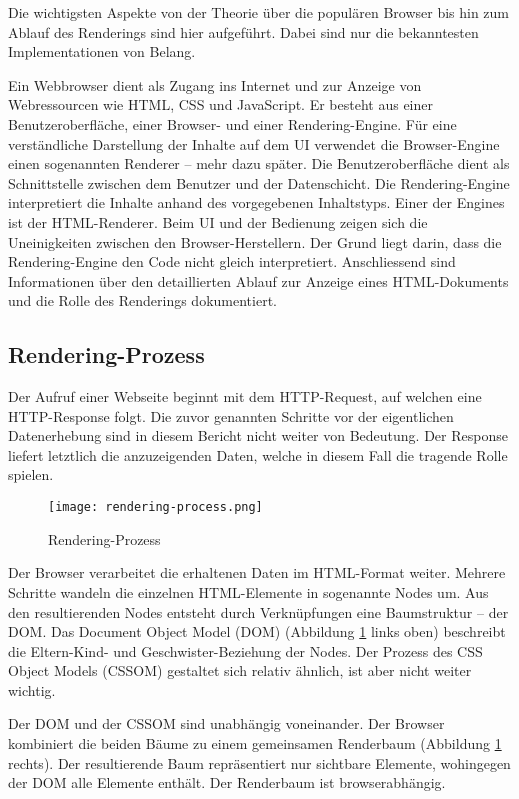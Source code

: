 Die wichtigsten Aspekte von der Theorie über die populären Browser bis hin zum Ablauf des Renderings sind hier aufgeführt. 
Dabei sind nur die bekanntesten Implementationen von Belang. 

Ein Webbrowser dient als Zugang ins Internet und zur Anzeige von Webressourcen wie HTML, CSS und JavaScript. 
Er besteht aus einer Benutzeroberfläche, einer Browser- und einer Rendering-Engine. 
Für eine verständliche Darstellung der Inhalte auf dem UI verwendet die Browser-Engine einen sogenannten Renderer – mehr dazu später. 
Die Benutzeroberfläche dient als Schnittstelle zwischen dem Benutzer und der Datenschicht. 
Die Rendering-Engine interpretiert die Inhalte anhand des vorgegebenen Inhaltstyps. 
Einer der Engines ist der HTML-Renderer. 
Beim UI und der Bedienung zeigen sich die Uneinigkeiten zwischen den Browser-Herstellern. 
Der Grund liegt darin, dass die Rendering-Engine den Code nicht gleich interpretiert. 
Anschliessend sind Informationen über den detaillierten Ablauf zur Anzeige eines HTML-Dokuments und die Rolle des Renderings dokumentiert. 


\subsection{Rendering-Prozess}
\label{sec:structureRendering}

Der Aufruf einer Webseite beginnt mit dem HTTP-Request, auf welchen eine HTTP-Response folgt.
Die zuvor genannten Schritte vor der eigentlichen Datenerhebung sind in diesem Bericht nicht weiter von Bedeutung.
Der Response liefert letztlich die anzuzeigenden Daten, welche in diesem Fall die tragende Rolle spielen.

\begin{figure}[!htb]
    \centering
    \texttt{[image: rendering-process.png]}
    \caption{\centering Rendering-Prozess}
    \label{img:renderingProcess}
\end{figure}

Der Browser verarbeitet die erhaltenen Daten im HTML-Format weiter. 
Mehrere Schritte wandeln die einzelnen HTML-Elemente in sogenannte Nodes um. 
Aus den resultierenden Nodes entsteht durch Verknüpfungen eine Baumstruktur – der DOM. 
Das Document Object Model (DOM) (Abbildung \ref{img:renderingProcess} links oben) beschreibt die Eltern-Kind- und Geschwister-Beziehung der Nodes. 
Der Prozess des CSS Object Models (CSSOM) gestaltet sich relativ ähnlich, ist aber nicht weiter wichtig. 

Der DOM und der CSSOM sind unabhängig voneinander.
Der Browser kombiniert die beiden Bäume zu einem gemeinsamen Renderbaum (Abbildung \ref{img:renderingProcess} rechts). 
Der resultierende Baum repräsentiert nur sichtbare Elemente, wohingegen der DOM alle Elemente enthält. 
Der Renderbaum ist browserabhängig. 

